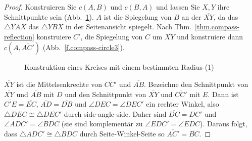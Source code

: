 \begin{proof}
Konstruieren Sie $c(A,B)$ und $c(B,A)$ und lassen Sie $X,Y$ ihre Schnittpunkte sein (Abb.~\ref{f.compass-circle1}). $A$ ist die Spiegelung von $B$ an der $\overline{XY}$, da das $\triangle YAX$ das $\triangle YBX$ in der Seitenansicht spiegelt. Nach Thm.~\ref{thm.compass-reflection} konstruiere $C'$, die Spiegelung von $C$ um $\overline{XY}$ und konstruiere dann $c(A,\overline{AC'})$ (Abb.~\ref{f.compass-circle3}).

\begin{figure}[b]
\begin{center}
\end{center}
\caption{Konstruktion eines Kreises mit einem bestimmten Radius (1)}\label{f.compass-circle1}
\end{figure}

$\overline{XY}$ ist die Mittelsenkrechte von $\overline{CC'}$ und $\overline{AB}$. Bezeichne den Schnittpunkt von $\overline{XY}$ und $\overline{AB}$ mit $D$ und den Schnittpunkt von $\overline{XY}$ und $\overline{CC'}$ mit $E$. Dann ist $\overline{C'E}=\overline{EC}$, $\overline{AD}=\overline{DB}$ und $\angle DEC=\angle DEC'$ ein rechter Winkel, also $\triangle DEC\cong\triangle DEC'$ durch side-angle-side. Daher sind $\overline{DC}=\overline{DC'}$ und $\angle ADC'=\angle BDC$ (sie sind komplementär zu $\angle EDC'=\angle EDC$). Daraus folgt, dass $\triangle ADC'\cong\triangle BDC$ durch Seite-Winkel-Seite so $\overline{AC'}=\overline{BC}$.
\end{proof}


